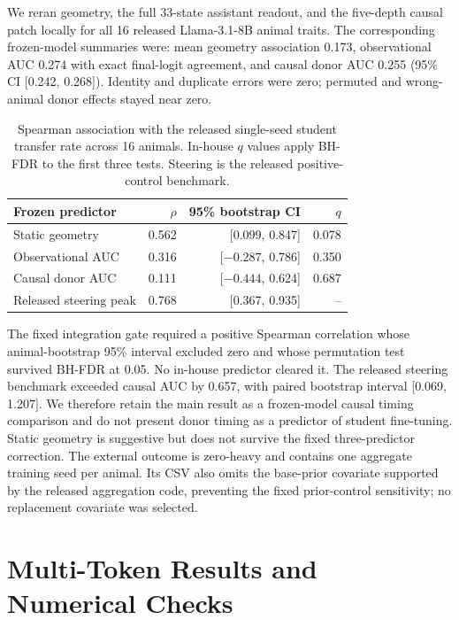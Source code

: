 \documentclass[letterpaper]{article}
\newcommand{\CI}[2]{95\% CI [#1, #2]}
\begin{document}
We reran geometry, the full 33-state assistant readout, and the five-depth causal
patch locally for all 16 released Llama-3.1-8B animal traits. The corresponding
frozen-model summaries were: mean geometry association 0.173, observational AUC
0.274 with exact final-logit agreement, and causal donor AUC 0.255
(\CI{0.242}{0.268}). Identity and duplicate errors were zero; permuted and
wrong-animal donor effects stayed near zero.

\begin{table}[t]
\centering
\small
\caption{Spearman association with the released single-seed student transfer
rate across 16 animals. In-house $q$ values apply BH-FDR to the first three
tests. Steering is the released positive-control benchmark.}
\label{tab:external-transfer}
\begin{tabular}{lrrr}
\toprule
Frozen predictor & $\rho$ & 95\% bootstrap CI & $q$ \\
\midrule
Static geometry & 0.562 & [0.099, 0.847] & 0.078 \\
Observational AUC & 0.316 & [$-0.287$, 0.786] & 0.350 \\
Causal donor AUC & 0.111 & [$-0.444$, 0.624] & 0.687 \\
Released steering peak & 0.768 & [0.367, 0.935] & -- \\
\bottomrule
\end{tabular}
\end{table}

The fixed integration gate required a positive Spearman correlation whose
animal-bootstrap 95\% interval excluded zero and whose permutation test survived
BH-FDR at 0.05. No in-house predictor cleared it. The released steering
benchmark exceeded causal AUC by 0.657, with paired bootstrap interval
[0.069, 1.207]. We therefore retain the main result as a frozen-model causal
timing comparison and do not present donor timing as a predictor of student
fine-tuning. Static geometry is suggestive but does not survive the fixed
three-predictor correction. The external outcome is zero-heavy and contains one
aggregate training seed per animal. Its CSV also omits the base-prior covariate
supported by the released aggregation code, preventing the fixed prior-control
sensitivity; no replacement covariate was selected.

\section{Multi-Token Results and Numerical Checks}
\end{document}
